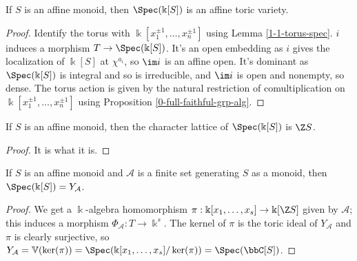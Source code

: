 \begin{proposition}
  \label{1-1-14-aff-tor-var-spec-aff-mon-alg}
  \leanok

  If $S$ is an affine monoid, then $\Spec(\Bbbk[S])$ is an affine toric variety.
\end{proposition}
\begin{proof}

  Identify the torus with $\Bbbk[x_1^{\pm1}, \dotsc, x_n^{\pm1}]$ using Lemma \ref{1-1-torus-spec}.
  $i$ induces a morphism $T \to \Spec(\Bbbk[S])$. It's an open embedding as $i$ gives the localization of $\Bbbk[S]$ at $\chi^{a_i}$, so $\im i$ is an affine open. It's dominant as $\Spec(\Bbbk[S])$ is integral and so is irreducible, and $\im i$ is open and nonempty, so dense. The torus action is given by the natural restriction of comultiplication on $\Bbbk[x_1^{\pm1}, \dotsc, x_n^{\pm1}]$ using Proposition \ref{0-full-faithful-grp-alg}.
\end{proof}


\begin{proposition}
  \label{1-1-14-char-spec-aff-mon-alg}

  If $S$ is an affine monoid, then the character lattice of $\Spec(\Bbbk[S])$ is $\Z S$.
\end{proposition}
\begin{proof}
  \uses{}

  It is what it is.
\end{proof}


\begin{proposition}
  \label{1-1-14-spec-aff-mon-alg-eq-ya}

  If $S$ is an affine monoid and $\mathcal A$ is a finite set generating $S$ as a monoid, then $\Spec(\Bbbk[S]) = Y_{\mathcal A}$.
\end{proposition}
\begin{proof}

  We get a $\Bbbk$-algebra homomorphism $\pi : \Bbbk[x_1, \dotsc, x_s] \to \Bbbk[\Z S]$ given by $\mathcal A$; this induces a morphism $\Phi_{\mathcal A} : T \to \Bbbk^s$. The kernel of $\pi$ is the toric ideal of $Y_{\mathcal A}$ and $\pi$ is clearly surjective, so $Y_{\mathcal A} = \mathbb V(\ker(\pi)) = \Spec(\Bbbk[x_1, \dotsc, x_s] / \ker(\pi)) = \Spec(\bbC[S])$.
\end{proof}


